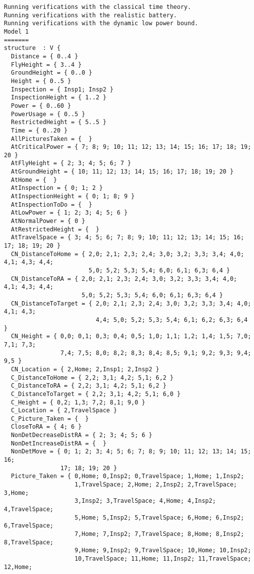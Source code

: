 \documentclass[12pt]{extarticle}
\begin{document}
\begin{lstlisting}[basicstyle=\tiny]
Running verifications with the classical time theory.
Running verifications with the realistic battery.
Running verifications with the dynamic low power bound.
Model 1
=======
structure  : V {
  Distance = { 0..4 }
  FlyHeight = { 3..4 }
  GroundHeight = { 0..0 }
  Height = { 0..5 }
  Inspection = { Insp1; Insp2 }
  InspectionHeight = { 1..2 }
  Power = { 0..60 }
  PowerUsage = { 0..5 }
  RestrictedHeight = { 5..5 }
  Time = { 0..20 }
  AllPicturesTaken = {  }
  AtCriticalPower = { 7; 8; 9; 10; 11; 12; 13; 14; 15; 16; 17; 18; 19; 20 }
  AtFlyHeight = { 2; 3; 4; 5; 6; 7 }
  AtGroundHeight = { 10; 11; 12; 13; 14; 15; 16; 17; 18; 19; 20 }
  AtHome = {  }
  AtInspection = { 0; 1; 2 }
  AtInspectionHeight = { 0; 1; 8; 9 }
  AtInspectionToDo = {  }
  AtLowPower = { 1; 2; 3; 4; 5; 6 }
  AtNormalPower = { 0 }
  AtRestrictedHeight = {  }
  AtTravelSpace = { 3; 4; 5; 6; 7; 8; 9; 10; 11; 12; 13; 14; 15; 16; 17; 18; 19; 20 }
  CN_DistanceToHome = { 2,0; 2,1; 2,3; 2,4; 3,0; 3,2; 3,3; 3,4; 4,0; 4,1; 4,3; 4,4;
                        5,0; 5,2; 5,3; 5,4; 6,0; 6,1; 6,3; 6,4 }
  CN_DistanceToRA = { 2,0; 2,1; 2,3; 2,4; 3,0; 3,2; 3,3; 3,4; 4,0; 4,1; 4,3; 4,4;
                      5,0; 5,2; 5,3; 5,4; 6,0; 6,1; 6,3; 6,4 }
  CN_DistanceToTarget = { 2,0; 2,1; 2,3; 2,4; 3,0; 3,2; 3,3; 3,4; 4,0; 4,1; 4,3;
                          4,4; 5,0; 5,2; 5,3; 5,4; 6,1; 6,2; 6,3; 6,4 }
  CN_Height = { 0,0; 0,1; 0,3; 0,4; 0,5; 1,0; 1,1; 1,2; 1,4; 1,5; 7,0; 7,1; 7,3;
                7,4; 7,5; 8,0; 8,2; 8,3; 8,4; 8,5; 9,1; 9,2; 9,3; 9,4; 9,5 }
  CN_Location = { 2,Home; 2,Insp1; 2,Insp2 }
  C_DistanceToHome = { 2,2; 3,1; 4,2; 5,1; 6,2 }
  C_DistanceToRA = { 2,2; 3,1; 4,2; 5,1; 6,2 }
  C_DistanceToTarget = { 2,2; 3,1; 4,2; 5,1; 6,0 }
  C_Height = { 0,2; 1,3; 7,2; 8,1; 9,0 }
  C_Location = { 2,TravelSpace }
  C_Picture_Taken = {  }
  CloseToRA = { 4; 6 }
  NonDetDecreaseDistRA = { 2; 3; 4; 5; 6 }
  NonDetIncreaseDistRA = {  }
  NonDetMove = { 0; 1; 2; 3; 4; 5; 6; 7; 8; 9; 10; 11; 12; 13; 14; 15; 16;
                17; 18; 19; 20 }
  Picture_Taken = { 0,Home; 0,Insp2; 0,TravelSpace; 1,Home; 1,Insp2;
                    1,TravelSpace; 2,Home; 2,Insp2; 2,TravelSpace; 3,Home;
                    3,Insp2; 3,TravelSpace; 4,Home; 4,Insp2; 4,TravelSpace;
                    5,Home; 5,Insp2; 5,TravelSpace; 6,Home; 6,Insp2; 6,TravelSpace;
                    7,Home; 7,Insp2; 7,TravelSpace; 8,Home; 8,Insp2; 8,TravelSpace;
                    9,Home; 9,Insp2; 9,TravelSpace; 10,Home; 10,Insp2;
                    10,TravelSpace; 11,Home; 11,Insp2; 11,TravelSpace; 12,Home;

\end{lstlisting}
\end{document}
